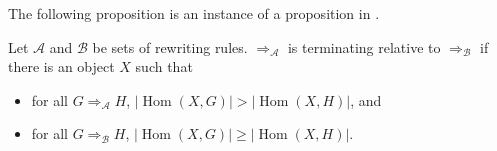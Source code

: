 \noindent The following proposition is an instance of a proposition in \cite[][page 31]{geser1990relative}.
\begin{proposition}
    \label{abstract_termination_criterion}
    Let $\mathcal{A}$ and $\mathcal{B}$ be sets of rewriting rules. \(\mathop{\Rightarrow}_\mathcal{A}\) is terminating relative to \(\mathop{\Rightarrow}_\mathcal{B}\) if there is an object \(X\) such that
\begin{itemize}
    \item for all \(G \mathop{\Rightarrow}_\mathcal{A} H\), \(|\operatorname{Hom}(X,G)| \mathop{>} |\operatorname{Hom}(X,H)|\), and
    \item for all \(G \mathop{\Rightarrow}_\mathcal{B} H\), \(|\operatorname{Hom}(X,G)| \mathop{\geq} |\operatorname{Hom}(X,H)|\).
\end{itemize}
\end{proposition}